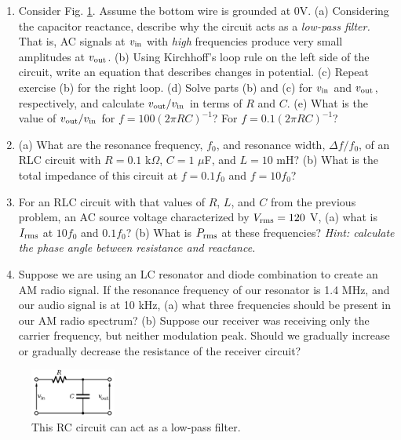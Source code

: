 \documentclass[12pt,twocolumn]{article}
\begin{document}
\begin{enumerate}
\item Consider Fig. \ref{fig:RC}.  Assume the bottom wire is grounded at 0V.  (a) Considering the capacitor reactance, describe why the circuit acts as a \textit{low-pass filter.}  That is, AC signals at $v_{\rm in}$ with \textit{high} frequencies produce very small amplitudes at $v_{\rm out}$. (b) Using Kirchhoff's loop rule on the left side of the circuit, write an equation that describes changes in potential.  (c) Repeat exercise (b) for the right loop.  (d) Solve parts (b) and (c) for $v_{\rm in}$ and $v_{\rm out}$, respectively, and calculate $v_{\rm out}/v_{\rm in}$ in terms of $R$ and $C$.  (e) What is the value of $v_{\rm out}/v_{\rm in}$ for $f = 100(2\pi R C)^{-1}$? For $f = 0.1(2\pi R C)^{-1}$? \\ \vspace{6cm}
\item (a) What are the resonance frequency, $f_0$, and resonance width, $\Delta f/f_0$, of an RLC circuit with $R = 0.1$ k$\Omega$, $C = 1$ $\mu$F, and $L = 10$ mH? (b) What is the total impedance of this circuit at $f = 0.1f_0$ and $f = 10f_0$? \\ \vspace{1.5cm}
\item For an RLC circuit with that values of $R$, $L$, and $C$ from the previous problem, an AC source voltage characterized by $V_{\rm rms} = 120$ V, (a) what is $I_{\rm rms}$ at $10 f_0$ and $0.1 f_0$? (b) What is $P_{\rm rms}$ at these frequencies? \textit{Hint: calculate the phase angle between resistance and reactance.} \\ \vspace{4cm}
\item Suppose we are using an LC resonator and diode combination to create an AM radio signal.  If the resonance frequency of our resonator is 1.4 MHz, and our audio signal is at 10 kHz, (a) what three frequencies should be present in our AM radio spectrum?  (b) Suppose our receiver was receiving only the carrier frequency, but neither modulation peak.  Should we gradually increase or gradually decrease the resistance of the receiver circuit?  \\ \vspace{2cm}
\end{enumerate}

\begin{figure}[hb]
\centering
\includegraphics[width=0.25\textwidth]{low-pass.png}
\caption{\label{fig:RC} \small This RC circuit can act as a low-pass filter.}
\end{figure}
\end{document}
